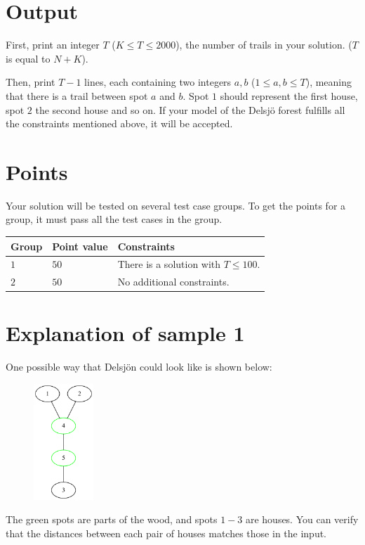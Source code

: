 \section*{Output}
First, print an integer $T$ ($K \leq T \leq 2000$), the number of trails in your solution. ($T$ is equal to $N+K$).

Then, print $T-1$ lines, each containing two integers $a,b$ ($1 \leq a,b \leq T$), meaning that there
is a trail between spot $a$ and $b$. Spot $1$ should represent the first house, spot $2$ the second house and so on.
If your model of the Delsjö forest fulfills all the constraints mentioned above, it will be accepted.


\section*{Points}
Your solution will be tested on several test case groups. To get the points for
a group, it must pass all the test cases in the group.

\noindent
\begin{tabular}{| l | l | p{12cm} |}
  \hline
  \textbf{Group} & \textbf{Point value} & \textbf{Constraints} \\ \hline
  $1$    & $50$       & There is a solution with $T \leq 100$. \\ \hline
  $2$    & $50$       & No additional constraints. \\ \hline
\end{tabular}

\section*{Explanation of sample 1}
One possible way that Delsjön could look like is shown below: 
\begin{center}
  \begin{figure}[h]
    \centering
    \includegraphics[width=0.2\textwidth]{sample-1.png}
  \end{figure}
\end{center}
The green spots are parts of the wood, and spots $1-3$ are houses. You can verify that the distances 
between each pair of houses matches those in the input.

